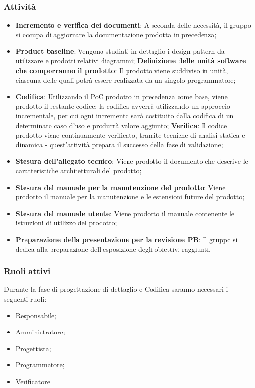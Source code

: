 \subsubsection{Attività}
\begin{itemize}
    \item \textbf{Incremento e verifica dei documenti}: A seconda delle necessità, il gruppo si occupa di aggiornare la documentazione prodotta in precedenza;
    \item \textbf{Product baseline}: Vengono studiati in dettaglio i design pattern da utilizzare e prodotti relativi diagrammi;
        \subitem \textbf{Definizione delle unità software che comporranno il prodotto}: Il prodotto viene suddiviso in unità, ciascuna delle quali potrà essere realizzata da un singolo programmatore;
    \item \textbf{Codifica}: Utilizzando il PoC prodotto in precedenza come base, viene prodotto il restante codice; la codifica avverrà utilizzando un approccio incrementale, per cui ogni incremento sarà costituito dalla codifica di un determinato caso d’uso e produrrà valore aggiunto;
        \subitem \textbf{Verifica}: Il codice prodotto viene continuamente verificato, tramite tecniche di analisi statica e dinamica - quest’attività prepara il successo della fase di validazione;
    \item \textbf{Stesura dell’allegato tecnico}: Viene prodotto il documento che descrive le caratteristiche architetturali del prodotto;
    \item \textbf{Stesura del manuale per la manutenzione del prodotto}: Viene prodotto il manuale per la manutenzione e le estensioni future del prodotto;
    \item \textbf{Stesura del manuale utente}: Viene prodotto il manuale contenente le istruzioni di utilizzo del prodotto;
    \item \textbf{Preparazione della presentazione per la revisione PB}: Il gruppo si dedica alla preparazione dell’esposizione degli obiettivi raggiunti.
\end{itemize}

\subsubsection{Ruoli attivi}
Durante la fase di progettazione di dettaglio e Codifica saranno necessari i seguenti ruoli:
\begin{itemize}
	\item Responsabile;
    \item Amministratore;
    \item Progettista;
    \item Programmatore;
    \item Verificatore.
\end{itemize}


